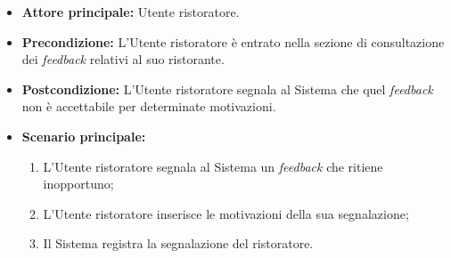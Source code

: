 \label{usecase:Segnalazione di un feedback}
\begin{itemize}
	\item \textbf{Attore principale:} Utente ristoratore.

	\item \textbf{Precondizione:} L'Utente ristoratore è entrato nella sezione di consultazione dei \textit{feedback} relativi al suo ristorante.

	\item \textbf{Postcondizione:} L'Utente ristoratore segnala al Sistema che quel \textit{feedback} non è accettabile per determinate motivazioni.


	\item \textbf{Scenario principale:}
	      \begin{enumerate}
		      \item L'Utente ristoratore segnala al Sistema un \textit{feedback} che ritiene inopportuno;
		      \item L'Utente ristoratore inserisce le motivazioni della sua segnalazione;
		      \item Il Sistema registra la segnalazione del ristoratore.

	      \end{enumerate}
\end{itemize}

